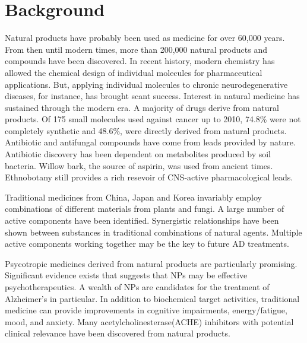 \documentclass[twocolumn]{article}
\begin{document}
\section{Background}

Natural products have probably been used as medicine for over 60,000 years.
From then until modern times,
more than 200,000 natural products and compounds have been discovered.
\cite{ji2009natural}
In recent history, modern chemistry has allowed the chemical design of
individual molecules for pharmaceutical applications.
But, applying individual molecules to chronic neurodegenerative diseases, for instance,
has brought scant success.
Interest in natural medicine has sustained through the modern era.
A majority of drugs derive from natural products.
Of 175 small molecules used against cancer up to 2010,
74.8\% were not completely synthetic and
48.6\%, were directly derived from natural products.
\cite{newman2012natural}
Antibiotic and antifungal compounds have come from leads provided by nature.
Antibiotic discovery has been dependent on metabolites produced by soil bacteria.
Willow bark, the source of aspirin, was used from ancient times.
\cite{laursen2004phenazine}
Ethnobotany still provides a rich resevoir of CNS-active pharmacological leads.
\cite{mcclatchey2009ethnobotany, perry1999medicinal}

Traditional medicines from China, Japan and Korea invariably employ combinations
of different materials from plants and fungi.
A large number of active components have been identified.
\cite{gao2013research}
Synergistic relationships have been shown between substances
in traditional combinations of natural agents.
Multiple active components working together may be the key
to future AD treatments.
\cite{kong2009hope, liu2014history}

Psycotropic medicines derived from natural products are particularly promising.
\cite{lake2000psychotropic}
Significant evidence exists that suggests that NPs
may be effective psychotherapeutics.
\cite{fugh1999dietary}
A wealth of NPs are candidates for the treatment of Alzheimer's in particular.
\cite{houghton2005natural}
In addition to biochemical target activities,
traditional medicine can provide improvements in
cognitive impairments, energy/fatigue, mood, and anxiety.
\cite{divino2011role}
Many acetylcholinesterase(ACHE) inhibitors with potential clinical relevance
have been discovered from natural products.
\cite{barbosa2006natural}
\end{document}
